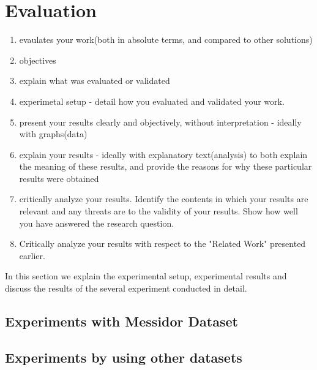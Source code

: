\chapter{Evaluation}

\begin{enumerate}
    \item evaulates your work(both in absolute terms, and compared to other solutions)
    \item objectives
    \item explain what was evaluated or validated
    \item experimetal setup - detail how you evaluated and validated your work.
    \item present your results clearly and objectively, without interpretation - ideally with graphs(data)
    \item explain your results - ideally with explanatory text(analysis) to both explain the meaning of these results, and provide the reasons for why these particular results were obtained
    \item critically analyze your results. Identify the contents in which your results are relevant and any threats are to the validity of your results. Show how well you have answered the research question.
    \item Critically analyze your results with respect to the "Related Work" presented earlier.
\end{enumerate}

In this section we explain the experimental setup, experimental results and discuss the results of the several experiment conducted in detail. 

\section{Experiments with Messidor Dataset}
\section{Experiments by using other datasets}